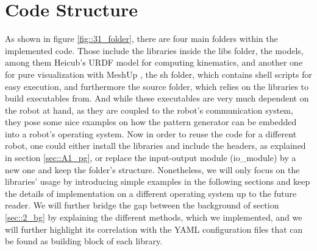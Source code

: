\FloatBarrier
\section{Code Structure}
\label{sec::31_cs}
As shown in figure \ref{fig::31_folder}, there are four main folders within the implemented code. Those include the libraries inside the libs folder, the models, among them Heicub's URDF model for computing kinematics, and another one for pure visualization with MeshUp \cite{meshup}, the sh folder, which contains shell scripts for easy execution, and furthermore the source folder, which relies on the libraries to build executables from. And while these executables are very much dependent on the robot at hand, as they are coupled to the robot's communication system, they pose some nice examples on how the pattern generator can be embedded into a robot's operating system. Now in order to reuse the code for a different robot, one could either install the libraries and include the headers, as explained in section \ref{sec::A1_pg}, or replace the input-output module (io\_module) by a new one and keep the folder's structure. Nonetheless, we will only focus on the libraries' usage by introducing simple examples in the following sections and keep the details of implementation on a different operating system up to the future reader. We will further bridge the gap between the background of section \ref{sec::2_bg} by explaining the different methods, which we implemented, and we will further highlight its correlation with the YAML \cite{ben2005yaml} configuration files that can be found as building block of each library. 
